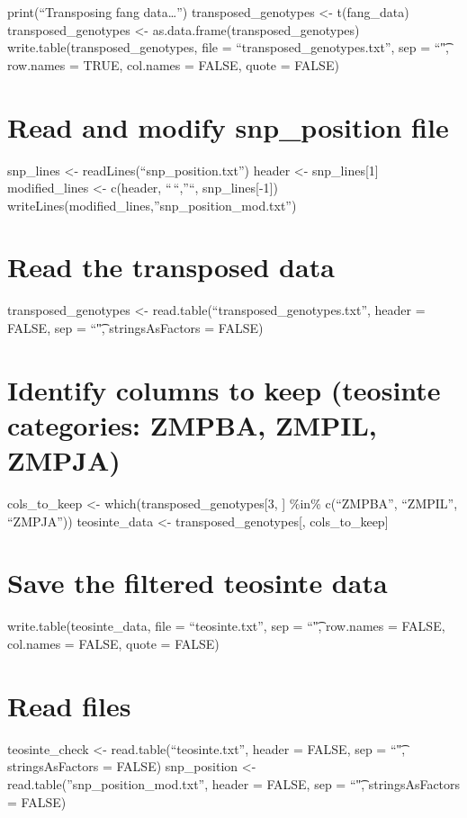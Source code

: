 \documentclass[
]{article}
\begin{document}
print(``Transposing fang data\ldots{}'') transposed\_genotypes
\textless- t(fang\_data) transposed\_genotypes \textless-
as.data.frame(transposed\_genotypes) write.table(transposed\_genotypes,
file = ``transposed\_genotypes.txt'', sep = ``\t", row.names = TRUE,
col.names = FALSE, quote = FALSE)

\section{Read and modify snp\_position
file}\label{read-and-modify-snp_position-file-1}

snp\_lines \textless- readLines(``snp\_position.txt'') header \textless-
snp\_lines{[}1{]} modified\_lines \textless- c(header, ``\,``,''``,
snp\_lines{[}-1{]})
writeLines(modified\_lines,''snp\_position\_mod.txt'')

\section{Read the transposed data}\label{read-the-transposed-data-1}

transposed\_genotypes \textless-
read.table(``transposed\_genotypes.txt'', header = FALSE, sep = ``\t",
stringsAsFactors = FALSE)

\section{Identify columns to keep (teosinte categories: ZMPBA, ZMPIL,
ZMPJA)}\label{identify-columns-to-keep-teosinte-categories-zmpba-zmpil-zmpja}

cols\_to\_keep \textless- which(transposed\_genotypes{[}3, {]} \%in\%
c(``ZMPBA'', ``ZMPIL'', ``ZMPJA'')) teosinte\_data \textless-
transposed\_genotypes{[}, cols\_to\_keep{]}

\section{Save the filtered teosinte
data}\label{save-the-filtered-teosinte-data}

write.table(teosinte\_data, file = ``teosinte.txt'', sep = ``\t",
row.names = FALSE, col.names = FALSE, quote = FALSE)

\section{Read files}\label{read-files-1}

teosinte\_check \textless- read.table(``teosinte.txt'', header = FALSE,
sep = ``\t", stringsAsFactors = FALSE) snp\_position \textless-
read.table(''snp\_position\_mod.txt'', header = FALSE, sep = ``\t",
stringsAsFactors = FALSE)
\end{document}
